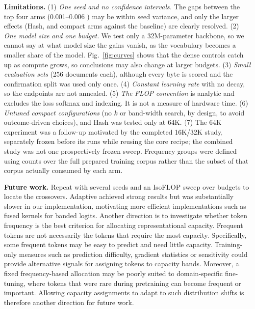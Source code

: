 \documentclass[10pt,a4paper]{article}
\newcommand{\bpb}{\text{BPB}}
\begin{document}
\textbf{Limitations.}
(1) \emph{One seed and no confidence intervals.} The gaps between the top four arms (0.001--0.006 \bpb) may be
within seed variance, and only the larger effects (Hash, and compact arms against the baseline) are clearly
resolved. (2) \emph{One model size and one budget.} We test only a 32M-parameter backbone, so we cannot say at
what model size the gains vanish, as the vocabulary becomes a smaller share of the model. Fig.~\ref{fig:curves}
shows that the dense controls catch up as compute grows, so conclusions may also change at larger budgets. (3) \emph{Small evaluation sets}
(256 documents each), although every byte is scored and the confirmation split was used only once. (4)
\emph{Constant learning rate} with no decay, so the endpoints are not annealed. (5) \emph{The FLOP
convention} is analytic and excludes the loss softmax and indexing. It is not a measure of hardware time. (6)
\emph{Untuned compact configurations} (no $k$ or band-width search, by design, to avoid outcome-driven
choices), and Hash was tested only at 64K. (7) The 64K experiment was a follow-up motivated by the completed
16K/32K study, separately frozen before its runs while reusing the core recipe; the combined study was not one prospectively frozen sweep. 
Frequency groups were defined using counts over the full prepared training corpus rather than the subset of that corpus actually consumed by each arm.

\textbf{Future work.} Repeat with several seeds and an IsoFLOP sweep over budgets to locate the crossovers. 
Adaptive achieved strong results but was substantially slower in our implementation, motivating more efficient 
implementations such as fused kernels for banded logits. Another direction is to investigate whether token 
frequency is the best criterion for allocating representational capacity. Frequent tokens are not necessarily 
the tokens that require the most capacity. Specifically, some frequent tokens may be easy to predict and need little capacity. Training-only measures such as prediction difficulty, gradient 
statistics or sensitivity could provide alternative signals for assigning tokens to capacity bands. Moreover, 
a fixed frequency-based allocation may be poorly suited to domain-specific fine-tuning, where tokens that were 
rare during pretraining can become frequent or important. Allowing capacity assignments to adapt to such distribution 
shifts is therefore another direction for future work.
\end{document}
